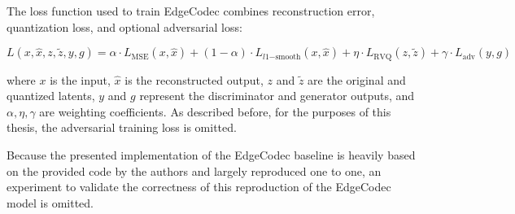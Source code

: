 The loss function used to train EdgeCodec combines reconstruction error, quantization loss, and optional adversarial loss:

\begin{equation}
L(x, \hat{x}, z, \tilde{z}, y, g) = \alpha \cdot L_\mathrm{MSE}(x, \hat{x}) + (1 - \alpha) \cdot L_{l1\mathrm{-smooth}}(x, \hat{x}) + \eta \cdot L_\mathrm{RVQ}(z, \tilde{z}) + \gamma \cdot L_\mathrm{adv}(y, g)
\end{equation}

where $x$ is the input, $\hat{x}$ is the reconstructed output, $z$ and $\tilde{z}$ are the original and quantized latents, $y$ and $g$ represent the discriminator and generator outputs, and $\alpha, \eta, \gamma$ are weighting coefficients. As described before, for the purposes of this thesis, the adversarial training loss is omitted.

Because the presented implementation of the EdgeCodec baseline is heavily based on the provided code by the authors and largely reproduced one to one, an experiment to validate the correctness of this reproduction of the EdgeCodec model is omitted.